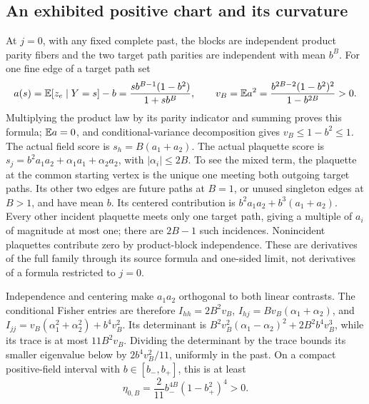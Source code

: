 \subsection{An exhibited positive chart and its curvature}
\label{sec:rg-spatial-proof-regular-chart}

At \(j=0\), with any fixed complete past, the blocks are independent
product parity fibers and the two target path parities are independent
with mean \(b^B\). For one fine edge of a target path set
\begin{equation}
 a(s)=\mathbb E[z_e\mid Y=s]-b
      =\frac{s b^{B-1}(1-b^2)}{1+s b^B},\qquad
 v_B=\mathbb E a^2=\frac{b^{2B-2}(1-b^2)^2}{1-b^{2B}}>0.
 \label{eq:rg-spatial-proof-product-score-contrast}
\end{equation}
Multiplying the product law by its parity indicator and summing proves
this formula; \(\mathbb E a=0\), and conditional-variance decomposition gives
\(v_B\le1-b^2\le1\). The actual field score is
\(s_h=B(a_1+a_2)\). The actual plaquette score is
\(s_j=b^2a_1a_2+\alpha_1a_1+\alpha_2a_2\), with
\(|\alpha_i|\le2B\). To see the mixed term, the plaquette at the common
starting vertex is the unique one meeting both outgoing target paths.
Its other two edges are future paths at \(B=1\), or unused singleton
edges at \(B>1\), and have mean \(b\). Its centered contribution is
\(b^2a_1a_2+b^3(a_1+a_2)\). Every other incident plaquette meets only
one target path, giving a multiple of \(a_i\) of magnitude at most one;
there are \(2B-1\) such incidences. Nonincident plaquettes contribute
zero by product-block independence. These are derivatives of the full
family through its source formula and one-sided limit, not derivatives
of a formula restricted to \(j=0\).

Independence and centering make \(a_1a_2\) orthogonal to both linear
contrasts. The conditional Fisher entries are therefore
\(I_{hh}=2B^2v_B\),
\(I_{hj}=Bv_B(\alpha_1+\alpha_2)\), and
\(I_{jj}=v_B(\alpha_1^2+\alpha_2^2)+b^4v_B^2\).
Its determinant is
\(B^2v_B^2(\alpha_1-\alpha_2)^2+2B^2b^4v_B^3\), while its trace is
at most \(11B^2v_B\). Dividing the determinant by the trace bounds its
smaller eigenvalue below by \(2b^4v_B^2/11\), uniformly in the past.
On a compact positive-field interval with \(b\in[b_-,b_+]\), this is
at least
\begin{equation}
 \eta_{0,B}=\frac2{11}b_-^{4B}(1-b_+^2)^4>0.
 \label{eq:rg-spatial-proof-fisher-product-floor}
\end{equation}

